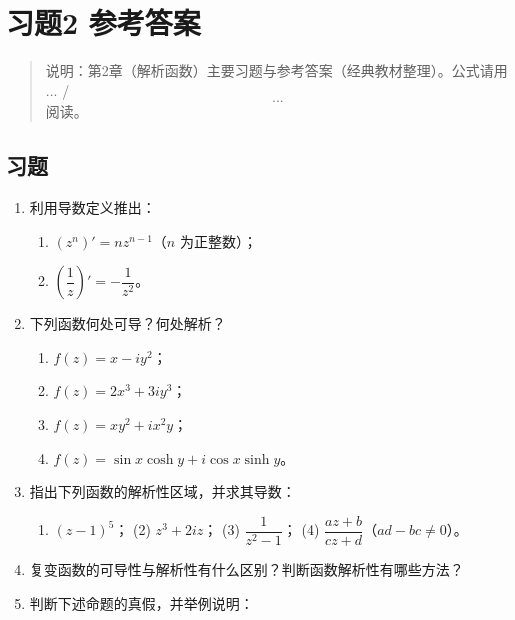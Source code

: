 \chapter{习题2 参考答案}\label{ux4e60ux98982-ux53c2ux8003ux7b54ux6848}

\begin{quote}
说明：第2章（解析函数）主要习题与参考答案（经典教材整理）。公式请用
\(...\) / \[...\] 阅读。
\end{quote}

\section{习题}\label{ux4e60ux9898-1}

\begin{enumerate}
\def\labelenumi{\arabic{enumi}.}
\item
  利用导数定义推出：

  \begin{enumerate}
  \def\labelenumii{(\arabic{enumii})}
  \tightlist
  \item
    \((z^n)'=nz^{n-1}\)（\(n\) 为正整数）；
  \item
    \(\left(\dfrac{1}{z}\right)'=-\dfrac{1}{z^2}\)。
  \end{enumerate}
\item
  下列函数何处可导？何处解析？

  \begin{enumerate}
  \def\labelenumii{(\arabic{enumii})}
  \tightlist
  \item
    \(f(z)=x-iy^2\)；
  \item
    \(f(z)=2x^3+3iy^3\)；
  \item
    \(f(z)=xy^2+ix^2y\)；
  \item
    \(f(z)=\sin x\cosh y+i\cos x\sinh y\)。
  \end{enumerate}
\item
  指出下列函数的解析性区域，并求其导数：

  \begin{enumerate}
  \def\labelenumii{(\arabic{enumii})}
  \tightlist
  \item
    \((z-1)^5\)； (2) \(z^3+2iz\)； (3) \(\dfrac{1}{z^2-1}\)； (4)
    \(\dfrac{az+b}{cz+d}\)（\(ad-bc\neq0\)）。
  \end{enumerate}
\item
  复变函数的可导性与解析性有什么区别？判断函数解析性有哪些方法？
\item
  判断下述命题的真假，并举例说明：


\end{enumerate}

